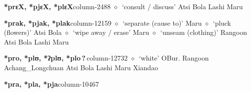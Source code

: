   \item {\footnotesize \textbf{*prɛX, *pjɛX, *plɛX}}{\tiny column-2488}
         $\diamond$~`consult / discuss'
         Atsi 
\hspace{1ex}
         Bola 
\hspace{1ex}
         Lashi 
\hspace{1ex}
         Maru 
  \item {\footnotesize \textbf{*prak, *pjak, *plak}}{\tiny column-12159}
         $\diamond$~`separate (cause to)'
         Maru 
\hspace{1ex}
         $\diamond$~`pluck (flowers)'
         Atsi 
\hspace{1ex}
         Bola 
\hspace{1ex}
         $\diamond$~`wipe away / erase'
         Maru 
\hspace{1ex}
         $\diamond$~`unseam (clothing)'
         Rangoon 
\hspace{1ex}
         Atsi 
\hspace{1ex}
         Bola 
\hspace{1ex}
         Lashi 
\hspace{1ex}
         Maru 
  \item {\footnotesize \textbf{*pro, *plʊ, *ʔplʊ, *plo\,?\,}}{\tiny column-12732}
         $\diamond$~`white'
         OBur. 
\hspace{1ex}
         Rangoon 
\hspace{1ex}
         Achang\_Longchuan 
\hspace{1ex}
         Atsi 
\hspace{1ex}
         Bola 
\hspace{1ex}
         Lashi 
\hspace{1ex}
         Maru 
\hspace{1ex}
         Xiandao 
  \item {\footnotesize \textbf{*pra, *pla, *pja}}{\tiny column-10467}
